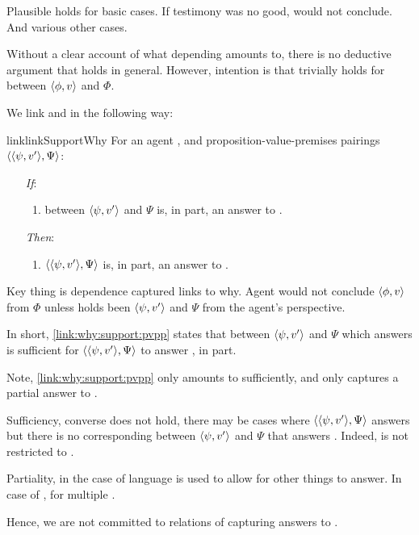 \begin{note}
  Plausible holds for basic cases.
  If testimony was no good, would not conclude.
  And various other cases.

  Without a clear account of what depending amounts to, there is no deductive argument that holds in general.
  However, intention is that trivially holds for \ros{} between \(\langle \phi, v \rangle\) and \(\Phi\).
\end{note}

\begin{note}
  We link \qWhyV{} and \qWhy{} in the following way:

  \begin{restatable}{link}{linkSupportWhy}
    \label{link:why:support:pvpp}
    For an agent \vAgent{}, and proposition-value-premises pairings \(\langle \langle \psi, v' \rangle, \Psi \rangle\):

    \begin{itemize}
    \item[\emph{If}:]
      \begin{enumerate}[label=\alph*., ref=(\alph*)]
      \item
         between \(\langle \psi, v' \rangle\) and \(\Psi\) is, in part, an answer to \qWhyV{}.
      \end{enumerate}
    \item[\emph{Then}:]
      \begin{enumerate}[label=\alph*., ref=(\alph*), resume]
      \item
        \(\langle \langle \psi, v' \rangle, \Psi \rangle\) is, in part, an answer to \qWhy{}.
      \end{enumerate}
    \end{itemize}
    \vspace{-\baselineskip}
  \end{restatable}

  Key thing is dependence captured links to why.
  Agent would not conclude \(\langle \phi, v \rangle\) from \(\Phi\) unless \ros{} holds been \(\langle \psi, v' \rangle\) and \(\Psi\) from the agent's perspective.

  In short, \autoref{link:why:support:pvpp} states that \support{} between \(\langle \psi, v' \rangle\) and \(\Psi\) which answers \qWhyV{} is sufficient for \(\langle \langle \psi, v' \rangle, \Psi \rangle\) to answer \qWhy{}, in part.

  Note, \autoref{link:why:support:pvpp} only amounts to sufficiently, and only captures a partial answer to \qWhy{}.

  Sufficiency, converse does not hold, there may be cases where \(\langle \langle \psi, v' \rangle, \Psi \rangle\) answers \qWhy{} but there is no corresponding \ros{} between \(\langle \psi, v' \rangle\) and \(\Psi\) that answers \qWhyV{}.
  Indeed, \qWhy{} is not restricted to .

  Partiality, in the case of \qWhy{}  language is used to allow for other things to answer.
  In case of \qWhyV{}, for multiple \ros{}.

  Hence, we are not committed to relations of \support{} capturing answers to \qWhy{}.
\end{note}

